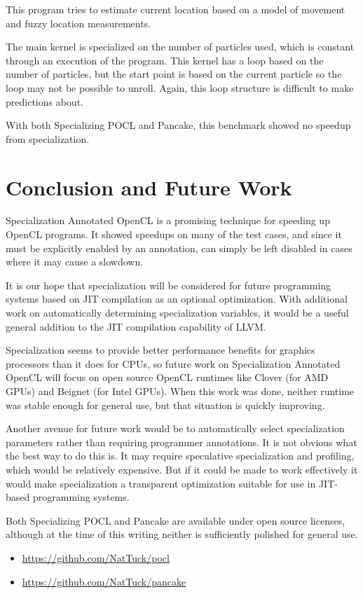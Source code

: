 \documentclass{acm_proc_article-sp}
\begin{document}
This program tries to estimate current location based on a model of movement
and fuzzy location measurements. 

The main kernel is specialized on the number of particles used, which is
constant through an execution of the program. This kernel has a loop based on
the number of particles, but the start point is based on the current particle
so the loop may not be possible to unroll. Again, this loop structure is
difficult to make predictions about.

With both Specializing POCL and Pancake, this benchmark showed no speedup from
specialization.

\section{Conclusion and Future Work}

Specialization Annotated OpenCL is a promising technique for speeding up OpenCL
programs. It showed speedups on many of the test cases, and since it must be
explicitly enabled by an annotation, can simply be left disabled in cases where
it may cause a slowdown.

It is our hope that specialization will be considered for future programming
systems based on JIT compilation as an optional optimization. With additional
work on automatically determining specialization variables, it would be a
useful general addition to the JIT compilation capability of LLVM.

Specialization seems to provide better performance benefits for graphics
processors than it does for CPUs, so future work on Specialization Annotated
OpenCL will focus on open source OpenCL runtimes like Clover (for AMD GPUs) and
Beignet (for Intel GPUs). When this work was done, neither runtime was stable
enough for general use, but that situation is quickly improving.

Another avenue for future work would be to automatically select specialization
parameters rather than requiring programmer annotations. It is not obvious what
the best way to do this is. It may require speculative specialization and
profiling, which would be relatively expensive. But if it could be made to work
effectively it would make specialization a transparent optimization suitable for
use in JIT-based programming systems.

Both Specializing POCL and Pancake are available under open source licenses,
although at the time of this writing neither is sufficiently polished for
general use.

\begin{itemize}
    \item \url{https://github.com/NatTuck/pocl}
    \item \url{https://github.com/NatTuck/pancake}
\end{itemize}




\balancecolumns
\end{document}
